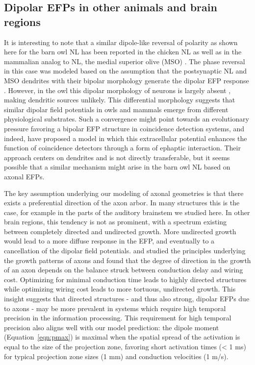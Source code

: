 \documentclass[]{elife}
\begin{document}
\subsection{Dipolar EFPs in other animals and brain
regions}\label{dipolar-efps-in-other-animals-and-brain-regions}

It is interesting to note that a similar dipole-like reversal of
polarity as shown here for the barn owl NL has been reported in the
chicken NL \citep{Schwarz1992Can} as well as in the mammalian analog to
NL, the medial superior olive (MSO) \citep{McLaughlin2010Oscillatory}.
The phase reversal in this case was modeled based on the assumption that
the postsynaptic NL and MSO dendrites with their bipolar morphology
generate the dipolar EFP response
\citep{McLaughlin2010Oscillatory, Goldwyn2014Model}. However, in the owl
this dipolar morphology of neurons is largely absent \citep{carr90},
making dendritic sources unlikely. This differential morphology suggests
that similar dipolar field potentials in owls and mammals emerge from
different physiological substrates. Such a convergence might point
towards an evolutionary pressure favoring a bipolar EFP structure in
coincidence detection systems, and indeed, \citet{Goldwyn2016Neuronal}
have proposed a model in which this extracellular potential enhances the
function of coincidence detectors through a form of ephaptic
interaction. Their approach centers on dendrites and is not directly
transferable, but it seems possible that a similar mechanism might arise
in the barn owl NL based on axonal EFPs.

The key assumption underlying our modeling of axonal geometries is that
there exists a preferential direction of the axon arbor. In many
structures this is the case, for example in the parts of the auditory
brainstem we studied here. In other brain regions, this tendency is not
as prominent, with a spectrum existing between completely directed and
undirected growth. More undirected growth would lead to a more diffuse
response in the EFP, and eventually to a cancellation of the dipolar
field potentials. \citet{Cuntz2010One} and \citet{Budd2010Neocortical}
studied the principles underlying the growth patterns of axons and found
that the degree of direction in the growth of an axon depends on the
balance struck between conduction delay and wiring cost. Optimizing for
minimal conduction time leads to highly directed structures while
optimizing wiring cost leads to more tortuous, undirected growth. This
insight suggests that directed structures - and thus also strong,
dipolar EFPs due to axons - may be more prevalent in systems which
require high temporal precision in the information processing. This
requirement for high temporal precision also aligns well with our model
prediction: the dipole moment (Equation~\ref{eqn:pmax})
is maximal when the spatial spread of the activation is equal to the
size of the projection zone, favoring short activation times
(\textless{} 1 ms) for typical projection zone sizes (1 mm) and
conduction velocities (1 m/s).
\end{document}
